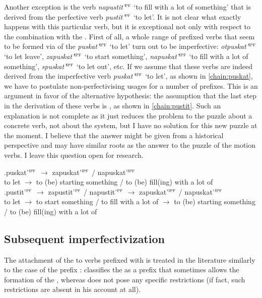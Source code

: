 Another exception is the verb \textit{napustit'}$^{\textsc{pf}}$ `to fill with a lot of something' that is derived from the perfective verb \textit{pustit'}$^{\textsc{pf}}$ `to let'. It is not clear what exactly happens with this particular verb, but it is exceptional not only with respect to the combination with the  . First of all, a whole range of prefixed verbs that seem to be formed via  of the  \textit{puskat'}$^{\textsc{ipf}}$ `to let' turn out to be imperfective: \textit{otpuskat'}$^{\textsc{ipf}}$ `to let leave', \textit{zapuskat'}$^{\textsc{ipf}}$ `to start something', \textit{napuskat'}$^{\textsc{ipf}}$ `to fill with a lot of something', \textit{spuskat'}$^{\textsc{ipf}}$ `to let out', etc. If we assume that these verbs are indeed derived from the imperfective verb \textit{puskat'}$^{\textsc{ipf}}$ `to let', as shown in \ref{chain:puskat}, we have to postulate non-perfectivising usages for a number of prefixes. This is an argument in favor of the alternative hypothesis: the assumption that the last step in the derivation of these verbs is , as shown in \ref{chain:pustit}. Such an explanation is not complete as it just reduces the problem to the puzzle about a concrete verb, not about the  system, but I have no solution for this new puzzle at the moment. I believe that the answer might be given from a historical perspective and may have similar roots as the answer to the puzzle of the motion verbs. I leave this question open for  research.

\exg.puskat'$^{\textsc{ipf}}$ $\rightarrow$ zapuskat'$^{\textsc{ipf}}$ / napuskat'$^{\textsc{ipf}}$ \label{chain:puskat}\\
{to let} $\rightarrow$ {to (be) starting something} / {to (be) fill(ing) with a lot of}\\

\exg.pustit'$^{\textsc{pf}}$ $\rightarrow$ zapustit'$^{\textsc{pf}}$ / napustit'$^{\textsc{pf}}$ $\rightarrow$ zapuskat'$^{\textsc{ipf}}$ / napuskat'$^{\textsc{ipf}}$ \label{chain:pustit}\\
{to let} $\rightarrow$ {to start something} / {to fill with a lot of} $\rightarrow$ {to (be) starting something} / {to (be) fill(ing) with a lot of}\\

\subsection{Subsequent imperfectivization}
The attachment of the  to verbs prefixed with  is treated in the literature similarly to the case of the  prefix : \citet[230]{Svenonius:04b} classifies the   as a prefix that sometimes allows the formation of the , whereas \citet{Tatevosov:09} does not pose any specific restrictions (if fact, such restrictions are absent in his account at all).

